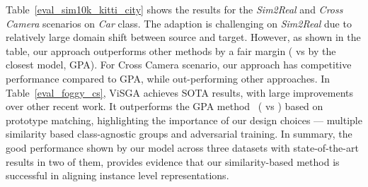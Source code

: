 \documentclass[10pt,twocolumn,letterpaper]{article}
\def\ourda{ViSGA\xspace}
\begin{document}
Table~\ref{eval_sim10k_kitti_city} shows the results for the \emph{Sim2Real} and \emph{Cross Camera} scenarios on \emph{Car} class. 
The adaption is challenging on \emph{Sim2Real} due to relatively large domain shift between source and target. However, as shown in the table, our approach outperforms other methods by a fair margin ( vs  by the closest model, GPA). For Cross Camera scenario, our approach has competitive performance compared to GPA\cite{GPA}, while out-performing other approaches. In Table~\ref{eval_foggy_cs}, \ourda achieves SOTA results, with large improvements over other recent work. 
It outperforms the GPA method~\cite{GPA} ( vs ) based on prototype matching, highlighting the importance of our design choices --- multiple similarity based class-agnostic groups and adversarial training.
In summary, the good performance shown by our model across three datasets with state-of-the-art results in two of them, provides evidence that our similarity-based method is successful in aligning instance level representations. 
\begin{table}[]
\center
{}
\vspace{1mm}
\caption{Experimental results of (\%) \emph{Foggy}.}
\vspace{0mm}
\label{eval_foggy_cs}
\end{table}
\end{document}

